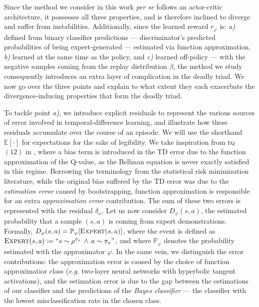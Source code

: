 Since the method we consider in this work \textit{per se} follows an
actor-critic architecture,
it possesses all three properties, and is therefore inclined to diverge
and suffer from instabilities.
Additionally, since the learned reward $r_\varphi$ is:
\emph{a)} defined from binary classifier predictions
--- discriminator's predicted probabilities of being expert-generated ---
estimated via function approximation,
\emph{b)} learned at the same time as the policy,
and \emph{c)} learned off-policy
--- with the negative samples coming from the replay distribution $\beta$,
the method we study consequently introduces an extra layer of complication in the deadly triad.
We now go over the three points and explain to what extent they each exacerbate
the divergence-inducing properties that form the deadly triad.

To tackle point \emph{a)}, we introduce explicit residuals
to represent the various sources of error involved in temporal-difference learning,
and illustrate how these residuals accumulate over the course of an episode.
We will use the shorthand $\mathbb{E}[\cdot]$ for expectations for the sake of legibility.
We take inspiration from \textsc{eq} $(12)$ in \cite{Fujimoto2018-pe},
where a bias term is introduced in the TD error due to the function approximation of the Q-value,
as the Bellman equation is never exactly satisfied in this regime.
Borrowing the terminology from the statistical risk minimization literature,
while the original bias suffered by the TD error was due to the \emph{estimation error}
caused by bootstrapping,
function approximation is responsible for an extra \emph{approximation error} contribution.
The sum of these two errors is represented with the residual $\delta_\omega$.
Let us now consider $D_\varphi (s,a)$, the estimated probability that a sample
$(s, a)$ is coming from expert demonstrations.
Formally,
$D_\varphi (s,a)
= \mathbb{P}_\varphi[\textsc{Expert}(s,a)]$, where the event is
defined as $\textsc{Expert}(s,a) \coloneqq
\text{``} s \sim \rho^{\pi_e} \, \land \, a \sim \pi_e \text{''}$,
and where $\mathbb{P}_\varphi$ denotes the probability estimated
with the approximator $\varphi$.
In the same vein,
we distinguish the error contributions:
the approximation error is caused by the choice of function approximatior class
(\textit{e.g.} two-layer neural networks with hyperbolic tangent activations),
and the estimation error is due to the gap between the estimations of our classifier
and the predictions of the \emph{Bayes classifier}
--- the classifier with the lowest misclassification rate in the chosen class.
